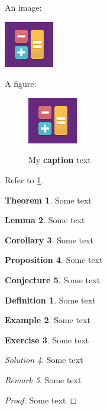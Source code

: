 \documentclass{article}
\theoremstyle{definition}
\newtheorem{theorem}{Theorem}[subparagraph]
\newtheorem{lemma}[theorem]{Lemma}
\newtheorem{corollary}[theorem]{Corollary}
\newtheorem{proposition}[theorem]{Proposition}
\newtheorem{conjecture}[theorem]{Conjecture}
\newtheorem{definition}{Definition}
\newtheorem{example}[definition]{Example}
\newtheorem{exercise}[definition]{Exercise}
\theoremstyle{remark}
\newtheorem{solution}[definition]{Solution}
\newtheorem{remark}[definition]{Remark}
\begin{document}
An image:

\includegraphics[alt={My alt text}]{logo.png}

A figure:

\begin{figure}[H]
  \label{fig:logo}
  \centering
  \includegraphics[alt={My alt text}]{logo.png}
  \caption{My \textbf{caption} text}
\end{figure}

Refer to \cref{fig:logo}.

\begin{theorem} Some text \end{theorem}
\begin{lemma} Some text \end{lemma}
\begin{corollary} Some text \end{corollary}
\begin{proposition} Some text \end{proposition}
\begin{conjecture} Some text \end{conjecture}
\begin{definition} Some text \end{definition}
\begin{example} Some text \end{example}
\begin{exercise} Some text \end{exercise}
\begin{solution} Some text \end{solution}
\begin{remark} Some text \end{remark}
\begin{proof} Some text \end{proof}
\end{document}
